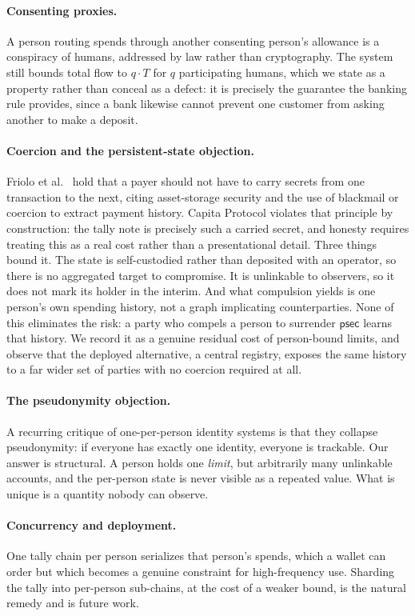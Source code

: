 \documentclass[11pt,a4paper]{article}
\theoremstyle{definition}
\theoremstyle{plain}
\theoremstyle{remark}
\newcommand{\psec}{\ensuremath{\mathsf{psec}}}
\begin{document}
\paragraph{Consenting proxies.}
A person routing spends through another consenting person's allowance is a conspiracy of humans, addressed by law rather than cryptography. The system still bounds total flow to $q \cdot T$ for $q$ participating humans, which we state as a property rather than conceal as a defect: it is precisely the guarantee the banking rule provides, since a bank likewise cannot prevent one customer from asking another to make a deposit.

\paragraph{Coercion and the persistent-state objection.}
Friolo et al.~\cite{friolo} hold that a payer should not have to carry secrets from one transaction to the next, citing asset-storage security and the use of blackmail or coercion to extract payment history. Capita Protocol violates that principle by construction: the tally note is precisely such a carried secret, and honesty requires treating this as a real cost rather than a presentational detail. Three things bound it. The state is self-custodied rather than deposited with an operator, so there is no aggregated target to compromise. It is unlinkable to observers, so it does not mark its holder in the interim. And what compulsion yields is one person's own spending history, not a graph implicating counterparties. None of this eliminates the risk: a party who compels a person to surrender $\psec$ learns that history. We record it as a genuine residual cost of person-bound limits, and observe that the deployed alternative, a central registry, exposes the same history to a far wider set of parties with no coercion required at all.

\paragraph{The pseudonymity objection.}
A recurring critique of one-per-person identity systems is that they collapse pseudonymity: if everyone has exactly one identity, everyone is trackable. Our answer is structural. A person holds one \emph{limit}, but arbitrarily many unlinkable accounts, and the per-person state is never visible as a repeated value. What is unique is a quantity nobody can observe.

\paragraph{Concurrency and deployment.}
One tally chain per person serializes that person's spends, which a wallet can order but which becomes a genuine constraint for high-frequency use. Sharding the tally into per-person sub-chains, at the cost of a weaker bound, is the natural remedy and is future work.
\end{document}
